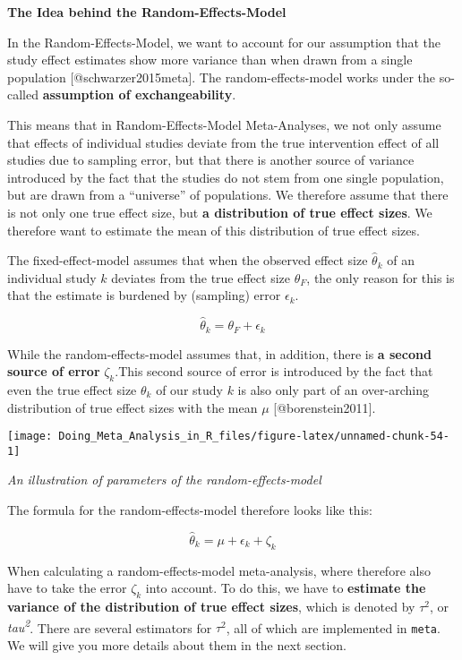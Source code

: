 \documentclass[]{book}
\theoremstyle{definition}
\theoremstyle{definition}
\theoremstyle{definition}
\theoremstyle{remark}
\begin{document}
\begin{rmdinfo}
\textbf{The Idea behind the Random-Effects-Model}

In the Random-Effects-Model, we want to account for our assumption that
the study effect estimates show more variance than when drawn from a
single population {[}@schwarzer2015meta{]}. The random-effects-model
works under the so-called \textbf{assumption of exchangeability}.

This means that in Random-Effects-Model Meta-Analyses, we not only
assume that effects of individual studies deviate from the true
intervention effect of all studies due to sampling error, but that there
is another source of variance introduced by the fact that the studies do
not stem from one single population, but are drawn from a ``universe''
of populations. We therefore assume that there is not only one true
effect size, but \textbf{a distribution of true effect sizes}. We
therefore want to estimate the mean of this distribution of true effect
sizes.

The fixed-effect-model assumes that when the observed effect size
\(\hat\theta_k\) of an individual study \(k\) deviates from the true
effect size \(\theta_F\), the only reason for this is that the estimate
is burdened by (sampling) error \(\epsilon_k\).

\[\hat\theta_k = \theta_F + \epsilon_k\]

While the random-effects-model assumes that, in addition, there is
\textbf{a second source of error} \(\zeta_k\).This second source of
error is introduced by the fact that even the true effect size
\(\theta_k\) of our study \(k\) is also only part of an over-arching
distribution of true effect sizes with the mean \(\mu\)
{[}@borenstein2011{]}.
\end{rmdinfo}

\begin{center}\texttt{[image: Doing\_Meta\_Analysis\_in\_R\_files/figure-latex/unnamed-chunk-54-1]} \end{center}

\emph{An illustration of parameters of the random-effects-model}

\begin{rmdinfo}
The formula for the random-effects-model therefore looks like this:

\[\hat\theta_k = \mu + \epsilon_k + \zeta_k\]

When calculating a random-effects-model meta-analysis, where therefore
also have to take the error \(\zeta_k\) into account. To do this, we
have to \textbf{estimate the variance of the distribution of true effect
sizes}, which is denoted by \(\tau^{2}\), or
\emph{tau\textsuperscript{2}}. There are several estimators for
\(\tau^{2}\), all of which are implemented in \texttt{meta}. We will
give you more details about them in the next section.
\end{rmdinfo}
\end{document}
